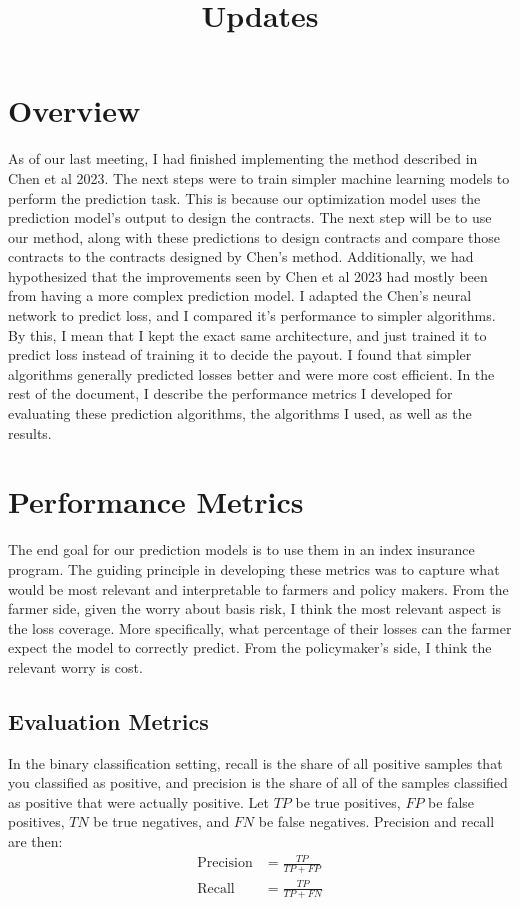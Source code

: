 \documentclass[11pt]{article}
\title{Updates}
\begin{document}
\maketitle
\section{Overview}
  As of our last meeting, I had finished implementing the method described in Chen et al 2023. The next steps were to train simpler machine learning models to perform the prediction task. This is because our optimization model uses the prediction model's output to design the contracts. The next step will be to use our method, along with these predictions to design contracts and compare those contracts to the contracts designed by Chen's method. Additionally, we had hypothesized that the improvements seen by Chen et al 2023 had mostly been from having a more complex prediction model. I adapted the Chen's neural network to predict loss, and I compared it's performance to simpler algorithms. By this, I mean that I kept the exact same architecture, and just trained it to predict loss instead of training it to decide the payout. I found that simpler algorithms generally predicted losses better and were more cost efficient. In the rest of the document, I describe the performance metrics I developed for evaluating these prediction algorithms, the algorithms I used, as well as the results. 

\section{Performance Metrics}
  The end goal for our prediction models is to use them in an index insurance program. The guiding principle in developing these metrics was to capture what would be most relevant and interpretable to farmers and policy makers. From the farmer side, given the worry about basis risk, I think the most relevant aspect is the loss coverage. More specifically, what percentage of their losses can the farmer expect the model to correctly predict. From the policymaker's side, I think the relevant worry is cost. 

  \subsection*{Evaluation Metrics} 
    In the binary classification setting, recall is the share of all positive samples that you classified as positive, and precision is the share of all of the samples classified as positive that were actually positive. Let $TP$ be true positives, $FP$ be false positives, $TN$ be true negatives, and $FN$ be false negatives. Precision and recall are then: 
    \begin{align*}
        \text{Precision} &= \frac{TP}{TP+FP}\\
        \text{Recall} &= \frac{TP}{TP+FN}
    \end{align*}
\end{document}
